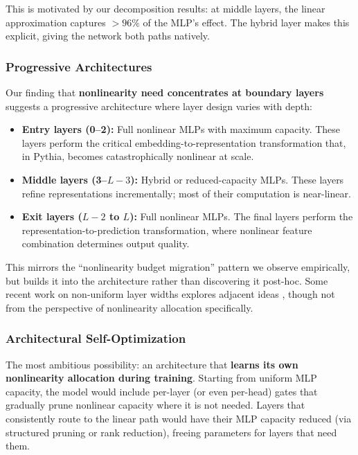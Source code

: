 \documentclass[11pt]{article}
\begin{document}
This is motivated by our decomposition results: at middle layers, the linear approximation captures $>96\%$ of the MLP's effect. The hybrid layer makes this explicit, giving the network both paths natively.

\subsubsection{Progressive Architectures}

Our finding that \textbf{nonlinearity need concentrates at boundary layers} suggests a progressive architecture where layer design varies with depth:
\begin{itemize}
    \item \textbf{Entry layers (0--2):} Full nonlinear MLPs with maximum capacity. These layers perform the critical embedding-to-representation transformation that, in Pythia, becomes catastrophically nonlinear at scale.
    \item \textbf{Middle layers (3--$L{-}3$):} Hybrid or reduced-capacity MLPs. These layers refine representations incrementally; most of their computation is near-linear.
    \item \textbf{Exit layers ($L{-}2$ to $L$):} Full nonlinear MLPs. The final layers perform the representation-to-prediction transformation, where nonlinear feature combination determines output quality.
\end{itemize}

\noindent This mirrors the ``nonlinearity budget migration'' pattern we observe empirically, but builds it into the architecture rather than discovering it post-hoc. Some recent work on non-uniform layer widths explores adjacent ideas \citep{he2024}, though not from the perspective of nonlinearity allocation specifically.

\subsubsection{Architectural Self-Optimization}

The most ambitious possibility: an architecture that \textbf{learns its own nonlinearity allocation during training}. Starting from uniform MLP capacity, the model would include per-layer (or even per-head) gates that gradually prune nonlinear capacity where it is not needed. Layers that consistently route to the linear path would have their MLP capacity reduced (via structured pruning or rank reduction), freeing parameters for layers that need them.
\end{document}
